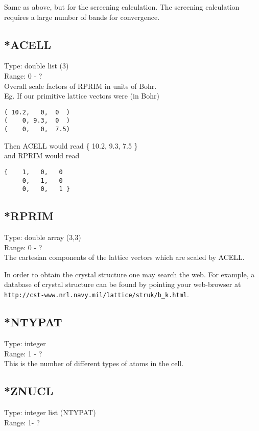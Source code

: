 \documentclass[12pt]{article}
\begin{document}
Same as above, but for the screening calculation. The screening calculation requires a large number of 
bands for convergence. 

\subsection{*ACELL}
Type: double list (3) \\
Range: 0 - ? \\

Overall scale factors of RPRIM in units of Bohr. \\
Eg. If our primitive lattice vectors were (in Bohr)
\begin{verbatim}
( 10.2,   0,  0  )     
(    0, 9.3,  0  )       
(    0,   0,  7.5) 
\end{verbatim}

Then ACELL would read \{ 10.2, 9.3, 7.5 \} \\
and RPRIM would read
\begin{verbatim}
{    1,   0,   0      
     0,   1,   0        
     0,   0,   1 } 
\end{verbatim}

\subsection{*RPRIM}
Type: double array (3,3)\\
Range: 0 - ? \\

The cartesian components of the lattice vectors which are scaled by ACELL.

In order to obtain the crystal structure one may search the web. For example,
a database of crystal structure can be found by pointing your web-browser at
 \verb|http://cst-www.nrl.navy.mil/lattice/struk/b_k.html|.

\subsection{*NTYPAT}
Type: integer \\
Range: 1 - ? \\

This is the number of different types of atoms in the cell.

\subsection{*ZNUCL}
Type: integer list (NTYPAT) \\
Range: 1- ?
\end{document}
